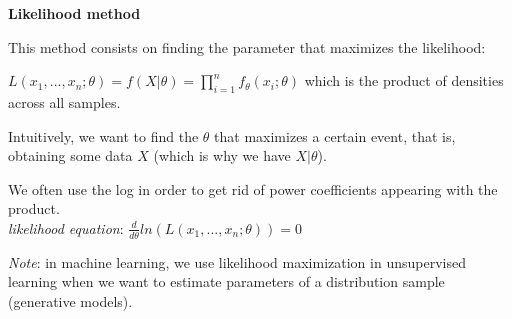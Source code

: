 {\fontsize{12pt}{22pt} \textbf{Likelihood method}\par}

\vspace{5mm}

This method consists on finding the parameter that maximizes the likelihood:

$L(x_1,...,x_n;\theta) = f(X | \theta) = \prod_{i=1}^{n}f_{\theta}(x_i;\theta)$ which is the product of densities across all samples.

\vspace{5mm}

Intuitively, we want to find the $\theta$ that maximizes a certain event, that is, obtaining some data $X$ (which is why we have $X | \theta$).

We often use the log in order to get rid of power coefficients appearing with the product. \\
\textit{likelihood equation}: $\frac{d}{d\theta}ln(L(x_1,...,x_n;\theta))=0$

\vspace{5mm}

\textit{Note}: in machine learning, we use likelihood maximization in unsupervised learning when we want to estimate parameters of a distribution sample (generative models).

\vspace{5mm}